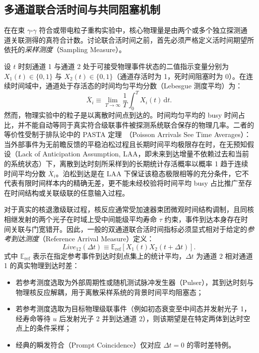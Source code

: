\subsection{多通道联合活时间与共同阻塞机制}\label{subsec:5-5-4}

在在束 $\gamma\text{-}\gamma$ 符合或带电粒子重构实验中，核心物理量是由两个或多个独立探测通道关联测得的真符合计数。讨论联合活时间之前，首先必须严格定义活时间期望所依托的\emph{采样测度}（Sampling Measure）。

设 $t$ 时刻通道 1 与通道 2 处于可接受物理事件状态的二值指示变量分别为 $X_1(t) \in \{0, 1\}$ 与 $X_2(t) \in \{0, 1\}$（通道存活时为 1，死时间阻塞时为 0）。在连续时间域中，通道处于存活态的时间均匀平均分数（Lebesgue 测度平均）为：
\begin{equation}\label{eq:5-5-time-avg-live}
\overline{X}_i \equiv \lim_{T \to \infty} \frac{1}{T} \int_0^T X_i(t) \, \mathrm{d}t.
\end{equation}
然而，物理实验中的粒子是以离散时间点到达的。时间均匀平均的 busy 时间占比，并不能自动等同于真实符合级联事件被探测系统联合保存的物理几率。二者的等价性受制于排队论中的 PASTA 定理~\cite{wolff-1982-poisson-arrivals-see-time-averages}（Poisson Arrivals See Time Averages）：当外部事件为无前瞻反馈的平稳泊松过程且长期时间平均极限存在时，在无预知假设（Lack of Anticipation Assumption, LAA，即未来到达增量不依赖过去和当前的系统状态）下，离散到达时刻所采样到的长期统计存活概率以概率 1 趋于连续时间平均分数 $\overline{X}_i$。泊松到达是在 LAA 下保证该稳态极限相等的充分条件，它不代表有限时间样本内的精确无差，更不能未经校验将时间平均 busy 占比推广至存在时间结构或关联级联的任意输入过程。

对于真实的核退激级联过程，核反应通常受加速器束团微观时间结构调制，且同核相继发射的两个光子在时域上受中间能级平均寿命 $\tau$ 约束，事件到达本身存在时间关联与门宽错开。因此，一般的双通道联合活时间指标必须显式相对于给定的\emph{参考到达测度}（Reference Arrival Measure）定义：
\begin{equation}\label{eq:5-5-joint-live-ref}
Live_{12}(\Delta t) \equiv \mathbb{E}_{\mathrm{ref}}[X_1(t) X_2(t + \Delta t)].
\end{equation}
式中 $\mathbb{E}_{\mathrm{ref}}$ 表示在指定参考事件到达时刻点集上的统计平均，$\Delta t$ 为通道 2 相对通道 1 的真实物理到达时差：
\begin{itemize}
\item 若参考测度选取为外部周期性或随机测试脉冲发生器（Pulser），其到达时刻与物理核反应解耦，用于离散采样系统的背景时间平均阻塞态；
\item 若参考测度选取为目标物理级联事件（例如初态衰变至中间态并发射光子 1，经寿命等待 $u$ 后发射光子 2 并到达通道 2），则该期望是在特定两体到达时空点上的条件采样；
\item 经典的瞬发符合（Prompt Coincidence）仅对应 $\Delta t = 0$ 的零时差特例。
\end{itemize}

